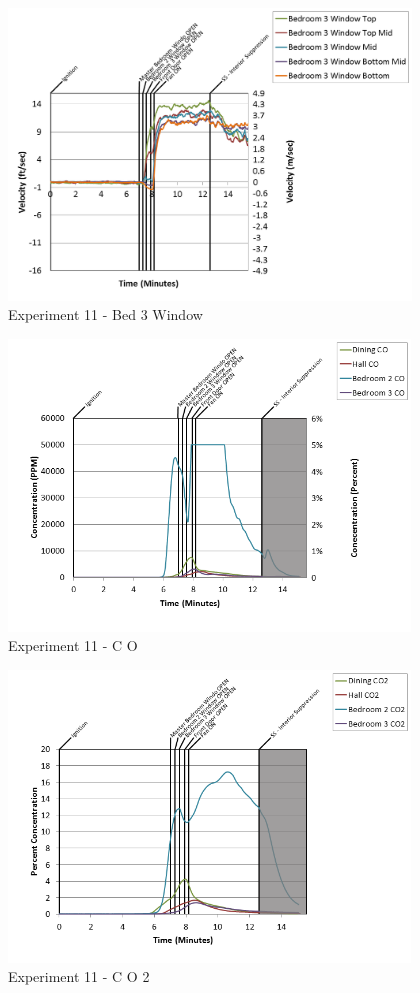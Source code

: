\documentclass{article}
\begin{document}
\begin{appendices}
\begin{figure}[h!]
	\centering
	\includegraphics[height=3.05in]{0_Images/Results_Charts/Exp_11_Charts/Bed3Window.png}
	\caption{Experiment 11 - Bed 3 Window}
\end{figure}

\clearpage

\begin{figure}[h!]
	\centering
	\includegraphics[height=3.05in]{0_Images/Results_Charts/Exp_11_Charts/CO.png}
	\caption{Experiment 11 - C O}
\end{figure}


\begin{figure}[h!]
	\centering
	\includegraphics[height=3.05in]{0_Images/Results_Charts/Exp_11_Charts/CO2.png}
	\caption{Experiment 11 - C O 2}
\end{figure}


\end{appendices}
\end{document}
